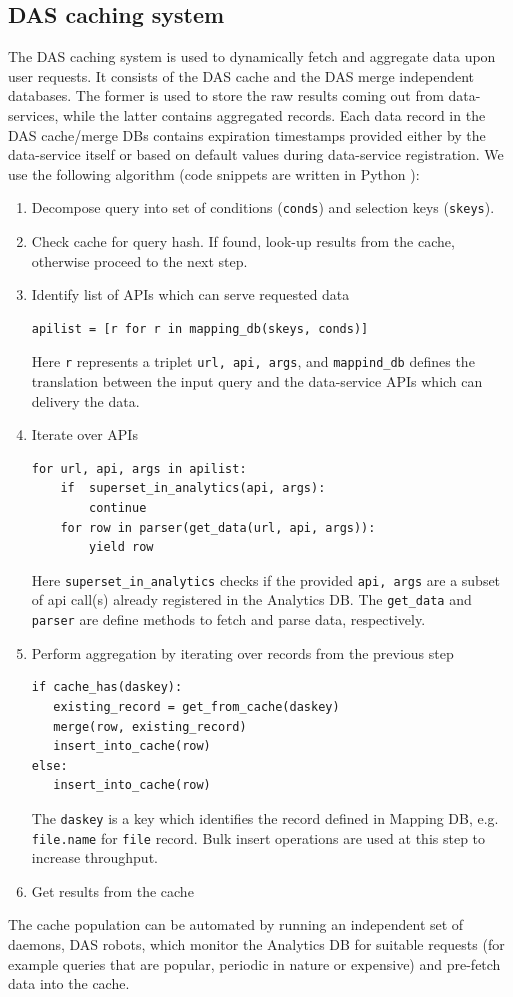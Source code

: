 \documentclass[3p,times]{elsarticle}
\begin{document}
\subsection{DAS caching system}
The DAS caching system is used to dynamically fetch
and aggregate data upon user requests. It consists of the
DAS cache and the DAS merge independent databases. The former is used to store
the raw results coming out from data-services, while the latter contains aggregated
records. Each data record in the DAS cache/merge DBs contains expiration timestamps 
provided either by the data-service itself or based on default values during 
data-service registration.
We use the following algorithm (code snippets are written in Python \cite{Python}):
\begin{enumerate}[1.]
\item Decompose query into set of conditions (\verb+conds+) 
and selection keys (\verb+skeys+).
\item Check cache for query hash. If found, look-up results from the cache,
otherwise proceed to the next step.
\item Identify list of APIs which can serve requested data
\begin{verbatim}
apilist = [r for r in mapping_db(skeys, conds)]
\end{verbatim}
Here \verb+r+ represents a triplet \verb+url, api, args+, and 
\verb+mappind_db+ defines the translation between the input query and the data-service
APIs which can delivery the data.
\item Iterate over APIs
\begin{verbatim}
for url, api, args in apilist:
    if  superset_in_analytics(api, args):
        continue
    for row in parser(get_data(url, api, args)):
        yield row
\end{verbatim}
Here \verb+superset_in_analytics+ checks if the provided \verb+api, args+
are a subset of api call(s) already registered in the Analytics DB. The 
\verb+get_data+ and \verb+parser+ are define methods to fetch and parse
data, respectively.
\item Perform aggregation by iterating over records from the previous step
\begin{verbatim}
if cache_has(daskey):
   existing_record = get_from_cache(daskey)
   merge(row, existing_record)
   insert_into_cache(row)
else:
   insert_into_cache(row)
\end{verbatim}
The \verb+daskey+
is a key which identifies the record defined in Mapping DB, e.g. \verb+file.name+
for \verb+file+ record.
Bulk insert operations are used at this step to increase throughput. 
\item Get results from the cache
\end{enumerate}
The cache population can be automated by running an
independent set of daemons, DAS robots, which monitor the 
Analytics DB for suitable requests (for example queries that are 
popular, periodic in nature or expensive) and pre-fetch data into the cache. 
\end{document}

